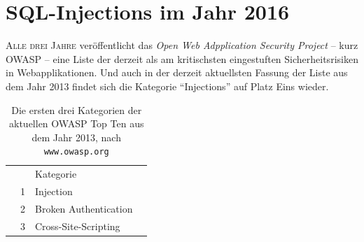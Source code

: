 







\tableofcontents
\clearpage
\begingroup
    \let\clearpage\relax
    \let\cleardoublepage\relax
    \let\cleardoublepage\relax

    \sffamily
    \listoffigures
    \vspace{4ex}

    \listoflistings
    \vspace{4ex}

\endgroup














\chapter{SQL-Injections im Jahr 2016}

\lettrine[lines=2]{A}{lle drei Jahre }veröffentlicht das \emph{Open Web Adpplication Security Project} -- kurz OWASP -- eine Liste der derzeit als am kritischsten eingestuften Sicherheitsrisiken in Webapplikationen. Und auch in der derzeit aktuellsten Fassung der Liste aus dem Jahr 2013 findet sich die Kategorie \enquote{Injections} auf Platz Eins wieder.

\begin{table}[ht!]
\begin{margincap}
\caption{Die ersten drei Kategorien der aktuellen OWASP Top Ten aus dem Jahr 2013, nach \texttt{www.owasp.org}}
\label{tab:owasp_top_ten}
\centering
\begin{tabu} to 
	\rowfont{\sffamily\bfseries\leavevmode\color{tableHeaderText}}
	& & Kategorie & \\
	\rowfont{\sffamily}
	& 1 & Injection & \\
	\rowfont{\sffamily}
	& 2 & Broken Authentication & \\
	\rowfont{\sffamily}
	& 3 & Cross-Site-Scripting & \\
\end{tabu}
\end{margincap}
\end{table}

